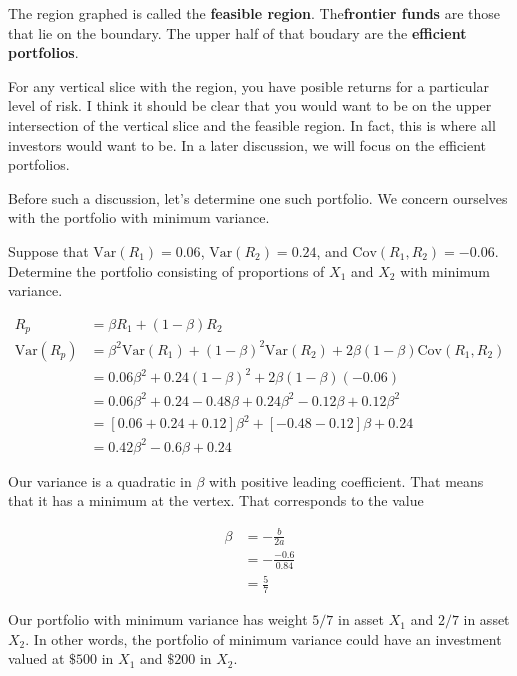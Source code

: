 \documentclass{ximera}
\begin{document}
\begin{definition}
The region graphed is called the {\bf feasible region}. The{\bf frontier funds} are those that lie on the boundary. The upper half of that boudary are the {\bf efficient portfolios}. 
\end{definition}

For any vertical slice with the region, you have posible returns for a particular level of risk. I think it should be clear that you would want to be on the upper intersection of the vertical slice and the feasible region. In fact, this is where all investors would want to be. In a later discussion, we will focus on the efficient portfolios. 

Before such a discussion, let's determine one such portfolio. We concern ourselves with the portfolio with minimum variance.

\begin{example}
Suppose that $\text{Var}(R_1)=0.06$, $\text{Var}(R_2)=0.24$, and $\text{Cov}(R_1, R_2)=-0.06$. Determine the portfolio consisting of proportions of $X_1$ and $X_2$ with minimum variance.
\end{example}

\begin{solution}
	\begin{align*}
	R_p 			&=\beta R_1+(1-\beta)R_2\\
	\text{Var}(R_p)	&=\beta^2\text{Var}(R_1)+(1-\beta)^2\text{Var}(R_2)+2\beta(1-\beta)\text{Cov}(R_1, R_2)\\
				&=0.06\beta^2+0.24(1-\beta)^2+2\beta(1-\beta)(-0.06)\\
				&=0.06\beta^2+0.24-0.48\beta+0.24\beta^2-0.12\beta+0.12\beta^2\\
				&=[0.06+0.24+0.12]\beta^2+[-0.48-0.12]\beta+0.24\\
				&=0.42\beta^2-0.6\beta+0.24
	\end{align*}

Our variance is a quadratic in $\beta$ with positive leading coefficient. That means that it has a minimum at the vertex. That corresponds to the value

	\begin{align*}
	\beta	&=-\frac{b}{2a}\\
		&=-\frac{-0.6}{0.84}\\
		&=\frac{5}{7}
	\end{align*}

Our portfolio with minimum variance has weight $5/7$ in asset $X_1$ and $2/7$ in asset $X_2$. In other words, the portfolio of minimum variance could have an investment valued at $\$500$ in $X_1$ and $\$200$ in $X_2$. 
\end{solution}
\end{document}
